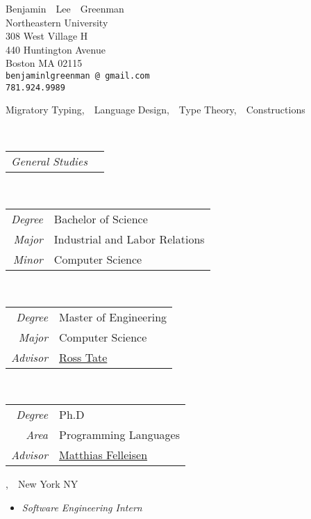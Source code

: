 \documentclass{article}
\makeatletter
\renewcommand{\maketitle}{
\begin{center}
  {\large{Benjamin~~Lee~~Greenman}}
\vspace{0.1cm}
\\Northeastern University
\\308 West Village H
\\440 Huntington Avenue
\\Boston MA 02115
\\\texttt{benjaminlgreenman\,@\,gmail.com}
\\\texttt{781.924.9989}
\end{center}
}
\makeatother
\begin{document}
\maketitle



Migratory Typing,~~Language Design,~~Type Theory,~~Constructions


 \hfill {}\\
\begin{tabular}{>{\it}r l}
General Studies & \\
\end{tabular}

 \hfill {}\\
\begin{tabular}{>{\it}r l}
Degree & Bachelor of Science\\
Major & Industrial and Labor Relations\\
Minor & Computer Science\\
\end{tabular}

 \hfill {}\\
\begin{tabular}{>{\it}r l}
Degree & Master of Engineering\\
Major & Computer Science\\
Advisor & \href{http://www.cs.cornell.edu/~ross/}{Ross Tate}
\end{tabular}

 \hfill {}\\
\begin{tabular}{>{\it}r l}
Degree & Ph.D \\
Area & Programming Languages \\
Advisor & \href{http://ccs.neu.edu/home/matthias}{Matthias Felleisen}
\end{tabular}



,~~New York NY
\begin{itemize}
  \item \emph{Software Engineering Intern} \hfill {}
\end{itemize}
\end{document}
